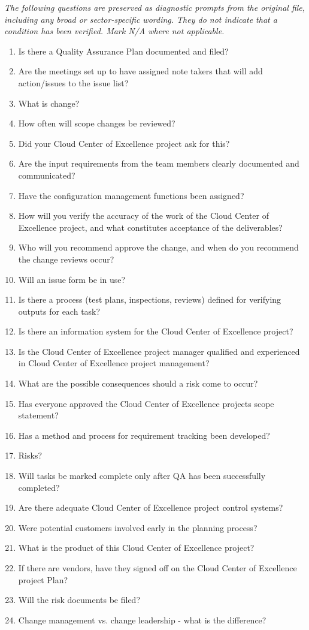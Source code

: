 \documentclass[10pt,letterpaper]{article}
\begin{document}
\textit{The following questions are preserved as diagnostic prompts from the original file, including any broad or sector-specific wording. They do not indicate that a condition has been verified. Mark N/A where not applicable.}
\begingroup\small\begin{enumerate}[leftmargin=2.1em, itemsep=4pt]
\item[1.] Is there a Quality Assurance Plan documented and filed?
\item[2.] Are the meetings set up to have assigned note takers that will add action/issues to the issue list?
\item[3.] What is change?
\item[4.] How often will scope changes be reviewed?
\item[5.] Did your Cloud Center of Excellence project ask for this?
\item[6.] Are the input requirements from the team members clearly documented and communicated?
\item[7.] Have the configuration management functions been assigned?
\item[8.] How will you verify the accuracy of the work of the Cloud Center of Excellence project, and what constitutes acceptance of the deliverables?
\item[9.] Who will you recommend approve the change, and when do you recommend the change reviews occur?
\item[10.] Will an issue form be in use?
\item[11.] Is there a process (test plans, inspections, reviews) defined for verifying outputs for each task?
\item[12.] Is there an information system for the Cloud Center of Excellence project?
\item[13.] Is the Cloud Center of Excellence project manager qualified and experienced in Cloud Center of Excellence project management?
\item[14.] What are the possible consequences should a risk come to occur?
\item[15.] Has everyone approved the Cloud Center of Excellence projects scope statement?
\item[16.] Has a method and process for requirement tracking been developed?
\item[17.] Risks?
\item[18.] Will tasks be marked complete only after QA has been successfully completed?
\item[19.] Are there adequate Cloud Center of Excellence project control systems?
\item[20.] Were potential customers involved early in the planning process?
\item[21.] What is the product of this Cloud Center of Excellence project?
\item[22.] If there are vendors, have they signed off on the Cloud Center of Excellence project Plan?
\item[23.] Will the risk documents be filed?
\item[24.] Change management vs. change leadership - what is the difference?
\end{enumerate}\endgroup
\end{document}
